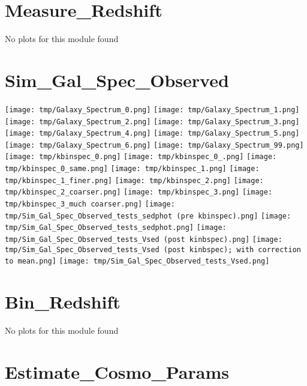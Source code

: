 \section{Measure\_Redshift}
No plots for this module found\section{Sim\_Gal\_Spec\_Observed}
\texttt{[image: tmp/Galaxy\_Spectrum\_0.png]}
\texttt{[image: tmp/Galaxy\_Spectrum\_1.png]}
\texttt{[image: tmp/Galaxy\_Spectrum\_2.png]}
\texttt{[image: tmp/Galaxy\_Spectrum\_3.png]}
\texttt{[image: tmp/Galaxy\_Spectrum\_4.png]}
\texttt{[image: tmp/Galaxy\_Spectrum\_5.png]}
\texttt{[image: tmp/Galaxy\_Spectrum\_6.png]}
\texttt{[image: tmp/Galaxy\_Spectrum\_99.png]}
\texttt{[image: tmp/kbinspec\_0.png]}
\texttt{[image: tmp/kbinspec\_0\_.png]}
\texttt{[image: tmp/kbinspec\_0\_same.png]}
\texttt{[image: tmp/kbinspec\_1.png]}
\texttt{[image: tmp/kbinspec\_1\_finer.png]}
\texttt{[image: tmp/kbinspec\_2.png]}
\texttt{[image: tmp/kbinspec\_2\_coarser.png]}
\texttt{[image: tmp/kbinspec\_3.png]}
\texttt{[image: tmp/kbinspec\_3\_much coarser.png]}
\texttt{[image: tmp/Sim\_Gal\_Spec\_Observed\_tests\_sedphot (pre kbinspec).png]}
\texttt{[image: tmp/Sim\_Gal\_Spec\_Observed\_tests\_sedphot.png]}
\texttt{[image: tmp/Sim\_Gal\_Spec\_Observed\_tests\_Vsed (post kinbspec).png]}
\texttt{[image: tmp/Sim\_Gal\_Spec\_Observed\_tests\_Vsed (post kinbspec); with correction to mean.png]}
\texttt{[image: tmp/Sim\_Gal\_Spec\_Observed\_tests\_Vsed.png]}
\section{Bin\_Redshift}
No plots for this module found\section{Estimate\_Cosmo\_Params}
